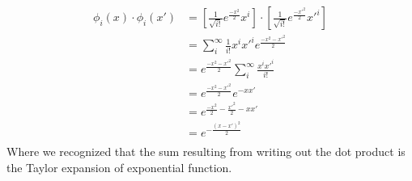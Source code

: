 \documentclass{article}
\newcommand{\1}{\mathbf{1}}
\begin{document}
\begin{align*}
    \phi_i(x)\cdot\phi_i(x') &= \left[\frac{1}{\sqrt{i!}}e^{\frac{-x^2}{2}}x^i\right] \cdot \left[\frac{1}{\sqrt{i!}}e^{\frac{-x'^2}{2}}x'^i\right] \\
    &= \sum_i^\infty \frac{1}{i!} x^i x'^i e^{\frac{-x^2-x'^2}{2}} \\
    &= e^{\frac{-x^2-x'^2}{2}} \sum_i^\infty \frac{x^i x'^i}{i!} \\
    &= e^{\frac{-x^2-x'^2}{2}} e^{-xx'} \\
    &= e^{\frac{-x^2}{2}-\frac{x'^2}{2}-xx'} \\
    &= e^{-\frac{(x-x')^2}{2}} \\
\end{align*}
Where we recognized that the sum resulting from writing out the dot product is the Taylor expansion of exponential function. 
\end{document}
